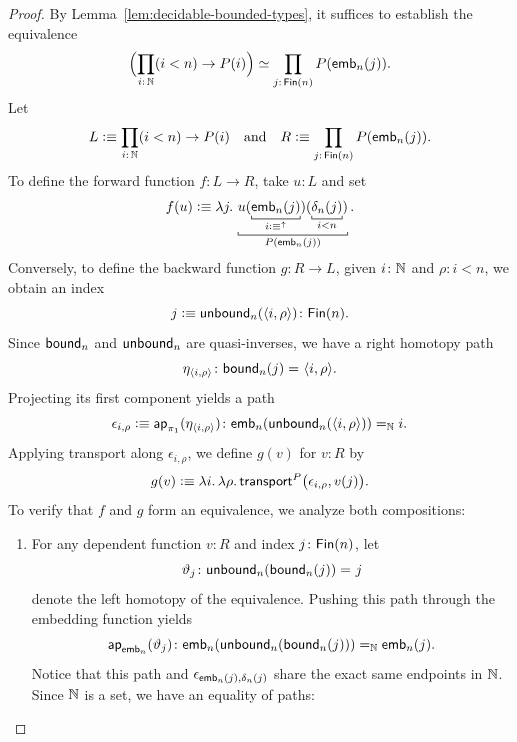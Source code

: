 \begin{proof}
    By Lemma~\ref{lem:decidable-bounded-types}, it suffices to establish the equivalence
    \[
        \Bigl(
            \prod_{i\colon\N}(i<n)\to P(i)
        \Bigr)
        \simeq
        \prod_{j\colon\fun{Fin}(n)}P(\fun{emb}_n(j)).
    \]  
    Let
    \[
        L\defeq\prod_{i\colon\N}(i<n)\to P(i)
        \quad\text{and}\quad
        R\defeq\prod_{j\colon\fun{Fin}(n)}P(\fun{emb}_n(j)).
    \]
    To define the forward function $f\colon L\to R$, take $u\colon L$ and set
    \[
        f(u)\defeq\lambda j.\,
            \explain[P(\fun{emb}_n(j))]{
            u(\explain[i\defeq{}^\uparrow]{\fun{emb}_n(j)})(\explain[i<n]{\delta_n(j)})
            }.
    \]
    Conversely, to define the backward function $g\colon R\to L$, given $i\colon\N$ and $\rho\colon i<n$, we obtain an index
    \[
        j\defeq\fun{unbound}_n(\dep{i,\rho})
            \colon\fun{Fin}(n).
    \]
    Since $\mathsf{bound}_n$ and $\mathsf{unbound}_n$ are quasi-inverses, we have a right homotopy path
    \[
        \eta_{\dep{i,\rho}}\colon
            \fun{bound}_n(j)\eq{}\dep{i,\rho}.
    \]
    Projecting its first component yields a path
    \[
        \epsilon_{i,\rho}
            \defeq\fun{ap}_{\pi_1}(\eta_{\dep{i,\rho}})
            \colon
                \fun{emb}_n(\fun{unbound}_n(\dep{i,\rho}))
                \eq\N i.
    \]
    Applying transport along $\epsilon_{i,\rho}$, we define $g(v)$ for $v\colon R$ by
    \[
        g(v)\mathrel{\vcentcolon}\equiv\lambda i.\,\lambda\rho.\,
            \mathsf{transport}^P\bigl(
                \epsilon_{i,\rho},
                v(j)
            \bigr).
    \]
    To verify that $f$ and $g$ form an equivalence, we analyze both compositions:
    \begin{enumerate}[-]
        \item For any dependent function $v\colon R$ and index $j\colon\fun{Fin}(n)$, let
        \[
            \vartheta_j\colon
                \fun{unbound}_n(\fun{bound}_n(j))\eq{}j
        \]
        denote the left homotopy of the equivalence. Pushing this path through the embedding function yields 
        \[
            \fun{ap}_{\fun{emb}_n}(\vartheta_j)\colon
                \fun{emb}_n(
                    \fun{unbound}_n(\fun{bound}_n(j))
                )
                \eq\N\fun{emb}_n(j).
        \]
        Notice that this path and $\epsilon_{\mathsf{emb}_n(j),\delta_n(j)}$ share the exact same endpoints in $\mathbb{N}$. Since $\mathbb{N}$ is a set, we have an equality of paths:
        \begin{equation}\label{eq:epsilon=ap}

\end{equation}
\end{enumerate}
\end{proof}
